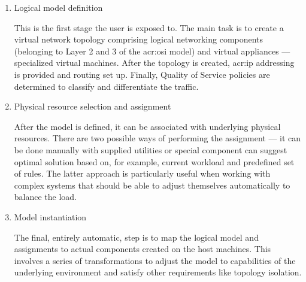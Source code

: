 \documentclass[11pt]{book}
\begin{document}
          \begin{enumerate}

            \item Logical model definition

              This is the first stage the user is exposed to. The main task is to create a virtual network topology
              comprising logical networking components (belonging to Layer 2 and 3 of the \gls{acr:osi} model) and
              virtual appliances --- specialized virtual machines. After the topology is created, \gls{acr:ip}
              addressing is provided and routing set up. Finally, Quality of Service policies are determined to classify
              and differentiate the traffic.

            \item Physical resource selection and assignment

              After the model is defined, it can be associated with underlying physical resources. There are two
              possible ways of performing the assignment --- it can be done manually with supplied utilities or special
              component can suggest optimal solution based on, for example, current workload and predefined set of
              rules. The latter approach is particularly useful when working with complex systems that should be able to
              adjust themselves automatically to balance the load.

            \item Model instantiation

              The final, entirely automatic, step is to map the logical model and assignments to actual components
              created on the host machines. This involves a series of transformations to adjust the model to
              capabilities of the underlying environment and satisfy other requirements like topology isolation.
                  
          \end{enumerate}
\end{document}
